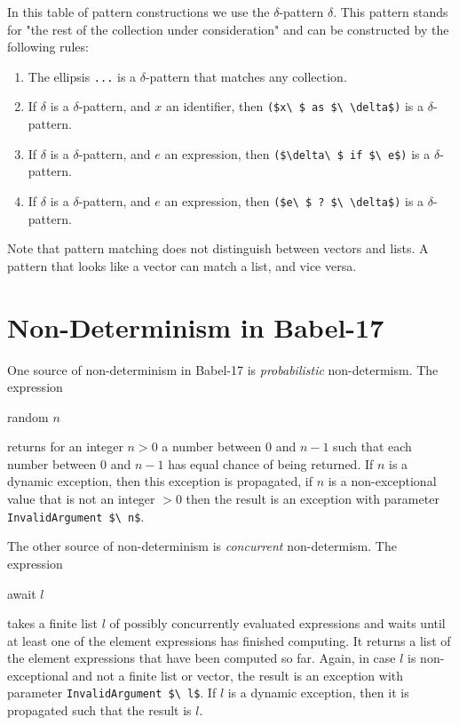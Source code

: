 \documentclass[11pt]{amsart}
\newcommand{\babelsrc}[1] {\lstinline!#1!}
\begin{document}
In this table of pattern constructions we use the $\delta$-pattern $\delta$. This pattern stands for "the rest of the collection under consideration" and can be constructed by the following rules:
\begin{enumerate}
\item The ellipsis \babelsrc{...} is a $\delta$-pattern that matches any collection.
\item If $\delta$ is a $\delta$-pattern, and $x$ an identifier, then \babelsrc{($x\ $ as $\ \delta$)} is a $\delta$-pattern.
\item If $\delta$ is a $\delta$-pattern, and $e$ an expression, then \babelsrc{($\delta\ $ if $\ e$)} is a $\delta$-pattern.
\item If $\delta$ is a $\delta$-pattern, and $e$ an expression, then \babelsrc{($e\ $ ? $\ \delta$)} is a $\delta$-pattern.\end{enumerate}

Note that pattern matching does not distinguish between vectors and lists. A pattern that looks like a vector can match a list, and vice versa.

\section{Non-Determinism in Babel-17}

One source of non-determinism in Babel-17 is \emph{probabilistic} non-determism. The expression
\begin{babellisting}
random $n$
\end{babellisting}
returns for an integer $n > 0$ a number between $0$ and $n-1$ such that each number between $0$ and $n-1$ has equal chance of being returned. If $n$ is a dynamic exception, then this exception is propagated, if $n$ is a non-exceptional value that is not an integer $> 0$ then the result is an exception with parameter \babelsrc{InvalidArgument $\ n$}.

The other source of non-determinism is \emph{concurrent} non-determism. The expression
\begin{babellisting}
await $l$
\end{babellisting}
takes a finite list $l$ of possibly concurrently evaluated expressions and waits until  at least one of the element expressions has finished computing. It returns a list of the element expressions that have been computed so far.
Again, in case $l$ is non-exceptional and not a finite  list or vector, the result is an exception with parameter
\babelsrc{InvalidArgument $\ l$}. If $l$ is a dynamic exception, then it is propagated such that the result is $l$. 
\end{document}
